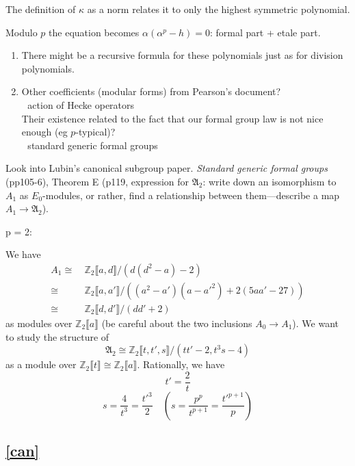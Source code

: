 \documentclass{rs}
\theoremstyle{definition}
\theoremstyle{remark}
\newcommand{\mb}[1]{\mathbb{#1}}
\newcommand{\mf}[1]{\mathfrak{#1}}
\newcommand{\BZ}{{\mb Z}}
\newcommand{\A}{\alpha}
\newcommand{\K}{\kappa}
\newcommand{\lb}{\llbracket}
\newcommand{\rb}{\rrbracket}
\numberwithin{equation}{section}
\numberwithin{thm}{section}
\begin{document}
The definition of $\K$ as a norm relates it to only the highest symmetric polynomial.  

Modulo $p$ the equation becomes $\A (\A^p - h) = 0$: formal part + etale part.  

\begin{enumerate}[\bf {Possibility} 1]
 \item There might be a recursive formula for these polynomials just as for division polynomials.  

 \item Other coefficients (modular forms) from Pearson's document?  \\
 \textcolor{white}{.} \hfill action of Hecke operators \\
 Their existence related to the fact that our formal group law is not nice enough (eg $p$-typical)?  \\
 \textcolor{white}{.} \hfill standard generic formal groups 
\end{enumerate}

Look into Lubin's canonical subgroup paper.  
{\em Standard generic formal groups} (pp105-6), 
Theorem E (p119, expression for $\mf A_2$: 
write down an isomorphism to $A_1$ as $E_0$-modules, 
or rather, find a relationship between them---describe a map $A_1 \to \mf A_2$).  

p = 2: 

We have 
\begin{equation*}
\begin{split}
 A_1 \cong & ~ \BZ_2 \lb a, d \rb / (d (d^2 - a) - 2) \\
     \cong & ~ \BZ_2 \lb a, a' \rb / ((a^2 - a') (a - a'^2) + 2 (5 a a' - 27)) \\
     \cong & ~ \BZ_2 \lb d, d' \rb / (d d' + 2) 
\end{split}
\end{equation*}
as modules over $\BZ_2 \lb a \rb$ (be careful about the two inclusions $A_0 \to A_1$).  
We want to study the structure of 
\[
 \mf A_2 \cong \BZ_2 \lb t, t', s \rb / (t t' - 2, t^3 s - 4) 
\]
as a module over $\BZ_2 \lb t \rb \cong \BZ_2 \lb a \rb$.  
Rationally, we have 
\[
 t' = \frac{2}{t} 
\]
\[
 s = \frac{4}{t^3} = \frac{t'^3}{2} \quad \left( s = \frac{p^p}{t^{p+1}} = \frac{t'^{p+1}}{p} \right) 
\]


\subsection{\href{http://www.ams.org/journals/tran/1979-251-00/S0002-9947-1979-0531971-4/S0002-9947-1979-0531971-4.pdf}{[can]}}
\end{document}
